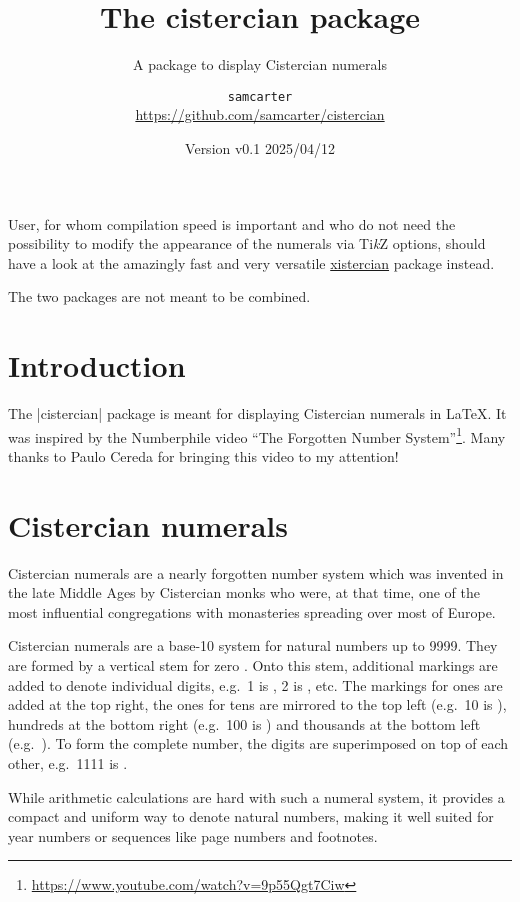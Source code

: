 \documentclass{scrartcl}
\title{The cistercian package}
\subtitle{A package to display Cistercian numerals}
\author{%
  \texorpdfstring{
    \texttt{samcarter}\\
    \url{https://github.com/samcarter/cistercian}\\
  }{samcarter}}
\date{Version v0.1 \textendash{} 2025/04/12}
\begin{document}
\maketitle
\thispagestyle{scrheadings}

\begin{tcolorbox}[width=.8\textwidth,center,sidebyside=false,title={Note}]
User, for whom compilation speed is important and who do not need the possibility to modify the appearance of the numerals via Ti\emph{k}Z options, should have a look at the amazingly fast and very versatile \href{https://ctan.org/pkg/xistercian}{xistercian} package instead.

The two packages are not meant to be combined.
\end{tcolorbox}

\section{Introduction}

The \saminline|cistercian| package is meant for displaying Cistercian numerals in \LaTeX{}.
It was inspired by the Numberphile video ``The Forgotten Number System''\footnote{\url{https://www.youtube.com/watch?v=9p55Qgt7Ciw}}. Many thanks to Paulo Cereda for bringing this video to my attention!

\blurb*

\section{Cistercian numerals}

Cistercian numerals are a nearly forgotten number system which was invented in the late Middle Ages by Cistercian monks who were, at that time, one of the most influential congregations with monasteries spreading over most of Europe.

Cistercian numerals are a base-10 system for natural numbers up to 9999.
They are formed by a vertical stem for zero .
Onto this stem, additional markings are added to denote individual digits, e.g.\ 1 is , 2 is , etc.
The markings for ones are added at the top right, the ones for tens are mirrored to the top left (e.g.\ 10 is ), hundreds at the bottom right (e.g.\ 100 is ) and thousands at the bottom left (e.g.\ ).
To form the complete number, the digits are superimposed on top of each other, e.g.\ 1111 is .

While arithmetic calculations are hard with such a numeral system, it provides a compact and uniform way to denote natural numbers, making it well suited for year numbers or sequences like page numbers and footnotes. 
\end{document}
